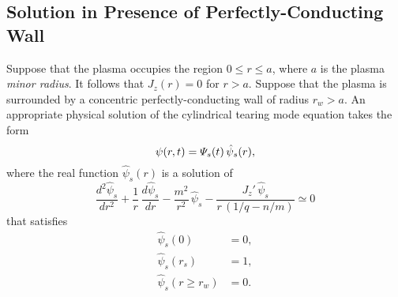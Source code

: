 \documentclass[notitlepage,12pt]{article}
\begin{document}
\subsection{Solution in Presence of Perfectly-Conducting Wall}\label{perfect}
Suppose that the plasma occupies the region $0\leq r\leq a$, where $a$ is the plasma {\em minor radius}. It follows that
$J_z(r)=0$ for $r>a$. Suppose that the plasma is surrounded by a concentric perfectly-conducting wall of radius $r_w>a$. An appropriate
physical solution of the cylindrical tearing mode equation takes the form
\begin{equation}\label{e99}
\psi(r,t)= {\mit\Psi}_s(t)\,\hat{\psi}_s(r),
\end{equation}
where the real function $\hat{\psi}_s(r)$ is a solution of 
\begin{equation}\label{e100}
\frac{d^2\hat{\psi}_s}{dr^2} + \frac{1}{r}\,\frac{d\hat{\psi}_s}{dr}-\frac{m^2}{r^2}\,\hat{\psi}_s - \frac{J_z'\,\hat{\psi}_s}{r\,(1/q-n/m)}\simeq 0
\end{equation}
that satisfies
\begin{align}\label{e101}
\hat{\psi}_s(0) &= 0,\\[0.5ex]
\hat{\psi}_s(r_s) &= 1,\label{e102}\\[0.5ex]
\hat{\psi}_s(r\geq r_w) &= 0.\label{e103}
\end{align}
\end{document}
